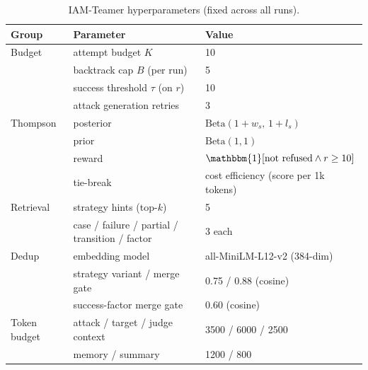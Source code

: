 \documentclass[a4paper,fleqn]{cas-sc}
\begin{document}
\begin{table}[htbp]
  \centering
  \caption{IAM-Teamer hyperparameters (fixed across all runs).}
  \label{tab:hyperparams}
  \footnotesize
  \begin{tabular}{@{}lll@{}}
    \toprule
    \textbf{Group} & \textbf{Parameter}                             & \textbf{Value}                                    \\
    \midrule
    Budget         & attempt budget $K$                             & 10                                                \\
                   & backtrack cap $B$ (per run)                    & 5                                                 \\
                   & success threshold $\tau$ (on $r$)              & 10                                                \\
                   & attack generation retries                      & 3                                                 \\
    \midrule
    Thompson       & posterior                                      & $\text{Beta}(1+w_s,\,1+l_s)$                      \\
                   & prior                                          & $\text{Beta}(1,1)$                                \\
                   & reward                                         & $\mathbbm{1}[\text{not refused} \wedge r \ge 10]$ \\
                   & tie-break                                      & cost efficiency (score per 1k tokens)             \\
    \midrule
    Retrieval      & strategy hints (top-$k$)                       & 5                                                 \\
                   & case / failure / partial / transition / factor & 3 each                                            \\
    \midrule
    Dedup          & embedding model                                & all-MiniLM-L12-v2 (384-dim)                       \\
                   & strategy variant / merge gate                  & 0.75 / 0.88 (cosine)                              \\
                   & success-factor merge gate                      & 0.60 (cosine)                                     \\
    \midrule
    Token budget   & attack / target / judge context                & 3500 / 6000 / 2500                                \\
                   & memory / summary                               & 1200 / 800                                        \\
    \bottomrule
  \end{tabular}
\end{table}
\end{document}
